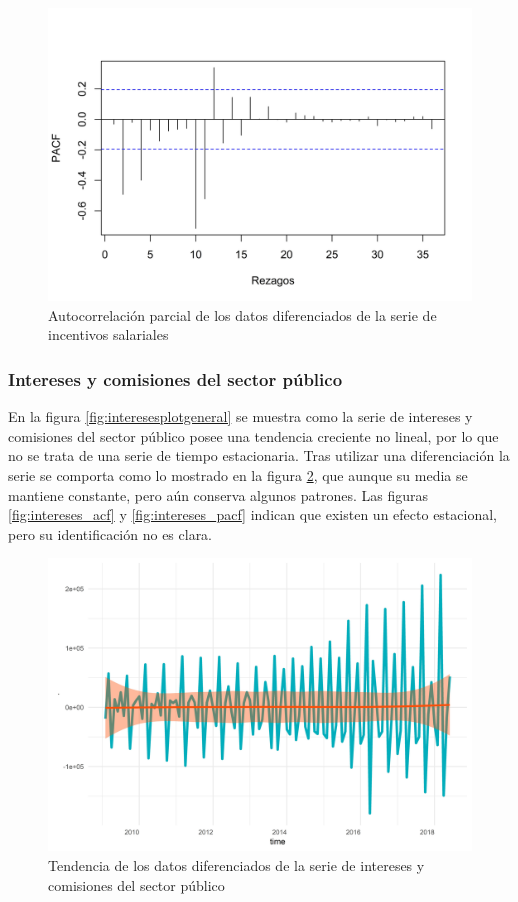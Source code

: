 \documentclass[
]{article}
\begin{document}
\begin{figure}[H]
\includegraphics[width=1\linewidth,height=1\textheight]{Tesis_files/figure-latex/incentivos_pacf-1} \caption{Autocorrelación parcial de los datos diferenciados de la serie de incentivos salariales}\label{fig:incentivos_pacf}
\end{figure}

\subsubsection{Intereses y comisiones del sector público}

En la figura \ref{fig:interesesplotgeneral} se muestra como la serie de
intereses y comisiones del sector público posee una tendencia creciente
no lineal, por lo que no se trata de una serie de tiempo estacionaria.
Tras utilizar una diferenciación la serie se comporta como lo mostrado
en la figura \ref{fig:intereses_comportamiento}, que aunque su media se
mantiene constante, pero aún conserva algunos patrones. Las figuras
\ref{fig:intereses_acf} y \ref{fig:intereses_pacf} indican que existen
un efecto estacional, pero su identificación no es clara.

\begin{figure}[H]
\includegraphics[width=1\linewidth,height=1\textheight]{Tesis_files/figure-latex/intereses_comportamiento-1} \caption{Tendencia de los datos diferenciados de la serie de intereses y comisiones del sector público}\label{fig:intereses_comportamiento}
\end{figure}
\end{document}
